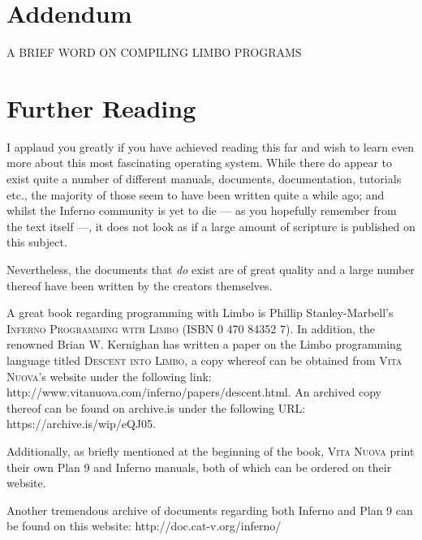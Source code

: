 \documentclass[a5paper,twoside,12pt]{report}
\begin{document}
\chapter*{Addendum}
  A BRIEF WORD ON COMPILING LIMBO PROGRAMS

\newpage

\chapter*{Further Reading}

I applaud you greatly if you have achieved reading this far and wish to learn even more about this most fascinating operating system. While there do appear to exist quite a number of different manuals, documents, documentation, tutorials etc., the majority of those seem to have been written quite a while ago; and whilst the Inferno community is yet to die — as you hopefully remember from the text itself —, it does not look as if a large amount of scripture is published on this subject. 

Nevertheless, the documents that \textit{do} exist are of great quality and a large number thereof have been written by the creators themselves. 

A great book regarding programming with Limbo is Phillip Stanley-Marbell's \textsc{Inferno Programming with Limbo} (ISBN 0 470 84352 7). In addition, the renowned Brian W. Kernighan has written a paper on the Limbo programming language titled \textsc{Descent into Limbo}, a copy whereof can be obtained from \textsc{Vita Nuova}'s website under the following link: http://www.vitanuova.com/inferno/papers/descent.html. An archived copy thereof can be found on archive.is under the following URL: https://archive.is/wip/eQJ05.

Additionally, as briefly mentioned at the beginning of the book, \textsc{Vita Nuova} print their own Plan 9 and Inferno manuals, both of which can be ordered on their website.

Another tremendous archive of documents regarding both Inferno and Plan 9 can be found on this website: http://doc.cat-v.org/inferno/
\end{document}

